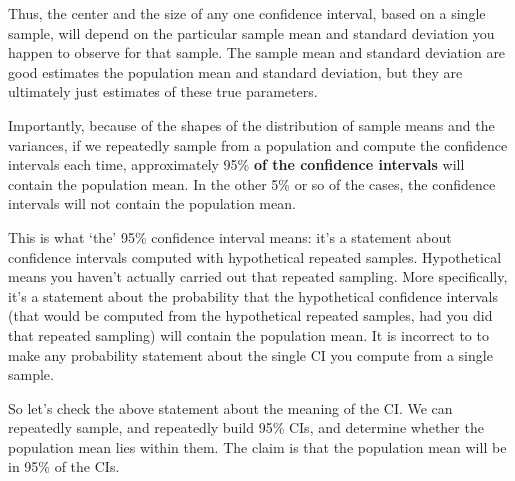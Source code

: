 \documentclass[12pt]{book}\usepackage[]{graphicx}\usepackage[]{color}
\begin{document}
Thus, the center and the size of any one confidence interval, based on a single
sample, will depend on the
particular sample mean and standard deviation you happen to observe for
that sample.  The sample mean and standard deviation 
are good estimates the population mean and standard
deviation, but they are ultimately just estimates of these true
parameters.

Importantly, because of the shapes of the distribution of
sample means and the variances, if we
repeatedly sample from a population and compute the confidence
intervals each time, approximately 95\% \textbf{of the confidence
intervals} will contain the population mean. In
the other 5\% or so of the cases, the confidence intervals
will not contain the population mean. 

This is what `the' 95\% confidence
interval means: it's a statement about confidence intervals computed with hypothetical repeated samples. Hypothetical means you haven't actually carried out that repeated sampling.
 More specifically, it's a statement about the probability that the hypothetical confidence intervals (that would be computed
from the hypothetical repeated samples, had you did that repeated sampling) will contain the population mean. It is incorrect to to make any probability statement about the single CI you compute from a single sample.

So let's check the above statement about the meaning of the CI. We can repeatedly sample, and repeatedly build 95\% CIs, and
determine whether the population mean lies within them. The claim is
that the population mean will be in 95\% of the CIs.
\end{document}
